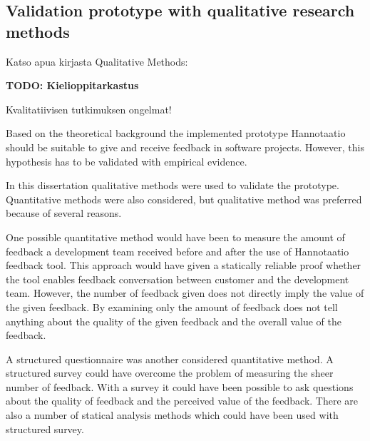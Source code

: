 \documentclass[english,12pt,a4paper,pdftex]{article}
\begin{document}
\subsection{Validation prototype with qualitative research methods}

Katso apua kirjasta Qualitative Methods: \citep{gummesson1999}

\textbf{TODO: Kielioppitarkastus}

Kvalitatiivisen tutkimuksen ongelmat!

Based on the theoretical background the implemented prototype Hannotaatio should be suitable to give and receive feedback in software projects. However, this hypothesis has to be validated with empirical evidence. 

In this dissertation qualitative methods were used to validate the prototype. Quantitative methods were also considered, but qualitative method was preferred because of several reasons.

One possible quantitative method would have been to measure the amount of feedback a development team received before and after the use of Hannotaatio feedback tool. This approach would have given a statically reliable proof whether the tool enables feedback conversation between customer and the development team. However, the number of feedback given does not directly imply the value of the given feedback. By examining only the amount of feedback does not tell anything about the quality of the given feedback and the overall value of the feedback. 

A structured questionnaire was another considered quantitative method. A structured survey could have overcome the problem of measuring the sheer number of feedback. With a survey it could have been possible to ask questions about the quality of feedback and the perceived value of the feedback. There are also a number of statical analysis methods which could have been used with structured survey.
\end{document}
